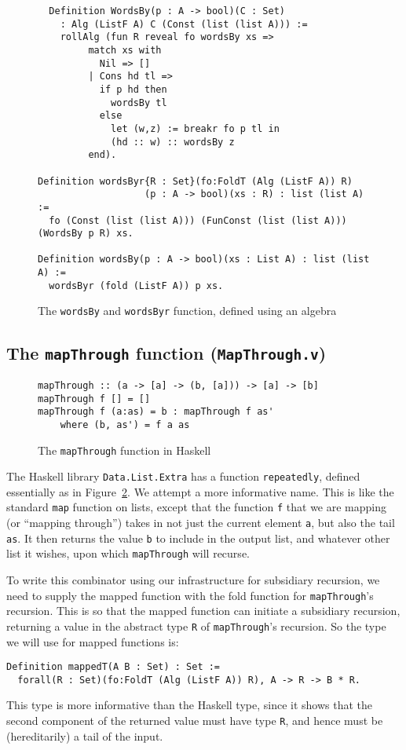\documentclass[a4paper,USenglish]{lipics-v2021}
\begin{document}
\begin{figure}
\begin{verbatim}
  Definition WordsBy(p : A -> bool)(C : Set)
    : Alg (ListF A) C (Const (list (list A))) :=
    rollAlg (fun R reveal fo wordsBy xs => 
         match xs with
           Nil => [] 
         | Cons hd tl =>
           if p hd then
             wordsBy tl
           else
             let (w,z) := breakr fo p tl in
             (hd :: w) :: wordsBy z
         end).

Definition wordsByr{R : Set}(fo:FoldT (Alg (ListF A)) R)
                   (p : A -> bool)(xs : R) : list (list A) :=
  fo (Const (list (list A))) (FunConst (list (list A))) (WordsBy p R) xs.

Definition wordsBy(p : A -> bool)(xs : List A) : list (list A) :=
  wordsByr (fold (ListF A)) p xs.
\end{verbatim}
\caption{The \texttt{wordsBy} and \texttt{wordsByr} function, defined using an algebra}
\label{fig:wordsby}
\end{figure}

\subsection{The \texttt{mapThrough} function (\texttt{MapThrough.v})}

\begin{figure}
\begin{verbatim}
mapThrough :: (a -> [a] -> (b, [a])) -> [a] -> [b]
mapThrough f [] = []
mapThrough f (a:as) = b : mapThrough f as'
    where (b, as') = f a as
\end{verbatim}
\caption{The \texttt{mapThrough} function in Haskell}
\label{fig:mapthroughhs}
\end{figure}

The Haskell library \verb|Data.List.Extra| has a function
\verb|repeatedly|, defined essentially as in
Figure~\ref{fig:mapthroughhs}. We attempt a more informative
name.  This is like the standard \verb|map| function on lists, except
that the function \verb|f| that we are mapping (or ``mapping
through'') takes in not just the current element \verb|a|, but also
the tail \verb|as|.  It then returns the value \verb|b| to include in
the output list, and whatever other list it wishes, upon which
\verb|mapThrough| will recurse.

To write this combinator using our infrastructure for subsidiary
recursion, we need to supply the mapped function with the fold
function for \verb|mapThrough|'s recursion.  This is so that the
mapped function can initiate a subsidiary recursion, returning a value
in the abstract type \verb|R| of \verb|mapThrough|'s recursion.  So
the type we will use for mapped functions is:
\begin{verbatim}
Definition mappedT(A B : Set) : Set :=
  forall(R : Set)(fo:FoldT (Alg (ListF A)) R), A -> R -> B * R.
\end{verbatim}
\noindent This type is more informative than the Haskell type,
since it shows that the second component of the returned value
must have type \verb|R|, and hence must be (hereditarily) a tail
of the input.
\end{document}
